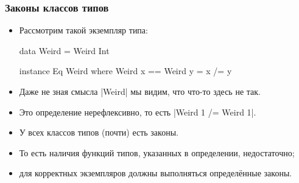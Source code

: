 \documentclass[10pt]{beamer}
\begin{document}


\begin{frame}[fragile]
  \frametitle{Законы классов типов}
  \begin{itemize}
    \item Рассмотрим такой экземпляр типа:
          \begin{haskell}
            data Weird = Weird Int

            instance Eq Weird where
                Weird x == Weird y = x /= y
          \end{haskell}
    \item Даже не зная смысла \haskinline|Weird| мы видим, что что-то здесь не так. \pause
    \item Это определение нерефлексивно, то есть \haskinline|Weird 1 /= Weird 1|.
    \item У всех классов типов (почти) есть законы.
    \item То есть наличия функций типов, указанных в определении, недостаточно;
    \item для корректных экземпляров должны выполняться определённые законы.
  \end{itemize}
\end{frame}
\end{document}
